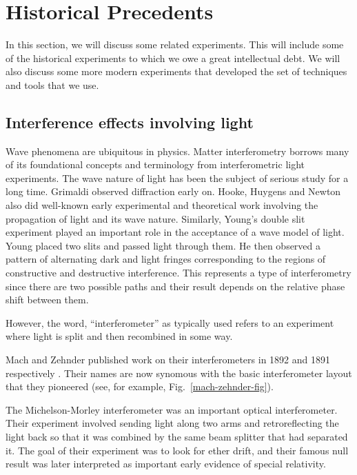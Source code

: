 \section{Historical Precedents}
In this section, we will discuss some related experiments. This will include some of the historical experiments to which we owe a great intellectual debt. We will also discuss some more modern experiments that developed the set of techniques and tools that we use. 
 \subsection{Interference effects involving light}
Wave phenomena are ubiquitous in physics. Matter interferometry borrows many of its foundational concepts and terminology from interferometric light experiments.
The wave nature of light has been the subject of serious study for a long time.
Grimaldi observed diffraction early on. Hooke, Huygens and Newton also did well-known early experimental and theoretical work involving the propagation of light and its wave nature. 
Similarly, Young's double slit experiment played an important role in the acceptance of a wave model of light. Young placed two slits and passed light through them. He then observed a pattern of alternating dark and light fringes corresponding to the regions of constructive and destructive interference. This represents a type of interferometry since there are two possible paths and their result depends on the relative phase shift between them. 

However, the word, ``interferometer'' as typically used refers to an experiment where light is split and then recombined in some way. 

Mach and Zehnder published work on their interferometers in 1892 and 1891 respectively \cite{mach}\cite{zehnder}. Their names are now synomous with the basic interferometer layout that they pioneered (see, for example, Fig.~\ref{mach-zehnder-fig}).  

The Michelson-Morley interferometer was an important optical interferometer. Their experiment involved sending light along two arms and retroreflecting the light back so that it was combined by the same beam splitter that had separated it. The goal of their experiment was to look for ether drift, and their famous null result was later interpreted as important early evidence of special relativity. 

